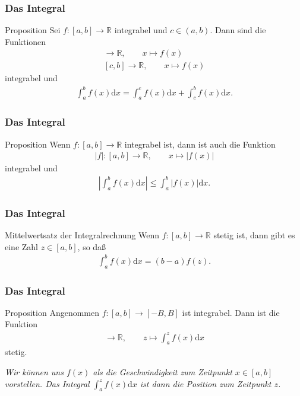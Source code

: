 \documentclass{beamer}
\newcommand\dd{\mathrm d}
\newcommand\RR{\mathbb R}
\newcommand{\abs}[1]{\left|#1\right|}
\renewcommand{\oe}{\"o}
\newcommand{\mytitle}{Das Integral}
\begin{document}
\begin{frame}\frametitle{\mytitle}
	\begin{block}{Proposition}
		Sei $f:[a,b]\to\RR$ integrabel und $c\in(a,b)$.
		Dann sind die Funktionen
		\begin{align*}
			[a,c]\to\RR,\qquad x\mapsto f(x)\\
			[c,b]\to\RR,\qquad x\mapsto f(x)
		\end{align*}
		integrabel und
		\begin{align*}
			\int_a^bf(x)\dd x=\int_a^cf(x)\dd x+\int_c^bf(x)\dd x.
		\end{align*}
	\end{block}
\end{frame}

\begin{frame}\frametitle{\mytitle}
	\begin{block}{Proposition}
		Wenn $f:[a,b]\to\RR$ integrabel ist, dann ist auch die Funktion
		\begin{align*}
			|f|:[a,b]\to\RR,\qquad x\mapsto|f(x)|
			\end{align*}
		integrabel und
		\begin{align*}
			\abs{\int_a^bf(x)\dd x}\leq\int_a^b|f(x)|\dd x.
		\end{align*}
	\end{block}
\end{frame}

\begin{frame}\frametitle{\mytitle}
	\begin{block}{Mittelwertsatz der Integralrechnung}
		Wenn $f:[a,b]\to\RR$ stetig ist, dann gibt es eine Zahl $z\in[a,b]$, so da\ss
		\begin{align*}
			\int_a^bf(x)\dd x=(b-a)f(z).
			\end{align*}
	\end{block}
\end{frame}

\begin{frame}\frametitle{\mytitle}
	\begin{block}{Proposition}
		Angenommen $f:[a,b]\to[-B,B]$ ist integrabel.
		Dann ist die Funktion
		\begin{align*}
			[a,b]\to\RR,\qquad z\mapsto\int_a^zf(x)\dd x
		\end{align*}
		stetig.
	\end{block}
	{\itshape Wir k\oe nnen uns $f(x)$ als die Geschwindigkeit zum Zeitpunkt $x\in[a,b]$ vorstellen. Das Integral $\int_a^zf(x)\dd x$ ist dann die Position zum Zeitpunkt $z$.}
\end{frame}
\end{document}
